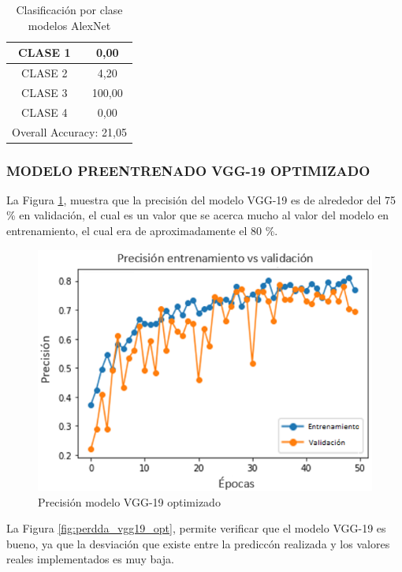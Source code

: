 \begin{table}[htbp]
	\centering
	\begin{tabular}{|c|c|}
		\hline
		CLASE 1 & 0,00 \bigstrut\\
		\hline
		CLASE 2 & 4,20 \bigstrut\\
		\hline
		CLASE 3 & 100,00 \bigstrut\\
		\hline
		CLASE 4 & 0,00 \bigstrut\\
		\hline
		\multicolumn{2}{|c|}{Overall Accuracy: 21,05} \bigstrut\\
		\hline
	\end{tabular}%
	\caption{Clasificación por clase modelos AlexNet}
	\label{tab:Alexoptclases}%
\end{table}%


\newpage
\subsubsection{\MakeUppercase{Modelo preentrenado VGG-19 optimizado}}
La Figura \ref{fig:preci_vgg19_OPT}, muestra que la precisión del modelo VGG-19 es de alrededor del 75 \% en validación, el cual es un valor que se acerca mucho al valor del modelo en entrenamiento, el cual era de aproximadamente el 80 \%.
\begin{figure}[ht]
	\centering
	\includegraphics[scale=0.6]{Figs/504.png}
	\caption{Precisión modelo VGG-19 optimizado}
	\label{fig:preci_vgg19_OPT}
\end{figure}

La Figura \ref{fig:perdda_vgg19_opt}, permite verificar que el modelo VGG-19 es bueno, ya que la desviación que existe entre la prediccón realizada y los valores reales implementados es muy baja.


